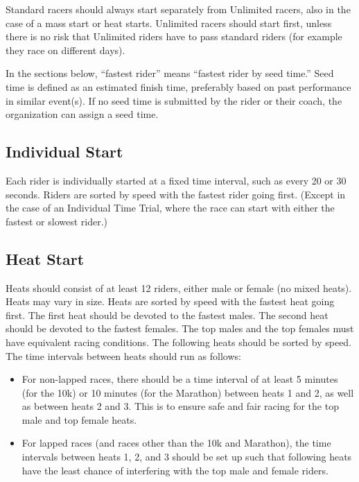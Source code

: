 Standard racers should always start separately from Unlimited racers, also in the case of a mass start or heat starts.
Unlimited racers should start first, unless there is no risk that Unlimited riders have to pass standard riders (for example they race on different days).

In the sections below, ``fastest rider'' means ``fastest rider by seed time.'' Seed time is defined as an estimated finish time, preferably based on past performance in similar event(s).
If no seed time is submitted by the rider or their coach, the organization can assign a seed time.

\subsection{Individual Start \label{subsec:road_heat-assignment_individual-start}}

Each rider is individually started at a fixed time interval, such as every 20 or 30 seconds.
Riders are sorted by speed with the fastest rider going first.
(Except in the case of an Individual Time Trial, where the race can start with either the fastest or slowest rider.)

\subsection{Heat Start \label{subsec:road_heat-assignment_heat-start}}

Heats should consist of at least 12 riders, either male or female (no mixed heats).
Heats may vary in size.
Heats are sorted by speed with the fastest heat going first.
The first heat should be devoted to the fastest males.
The second heat should be devoted to the fastest females.
The top males and the top females must have equivalent racing conditions.
The following heats should be sorted by speed.
The time intervals between heats should run as follows:
\begin{itemize}
\item For non-lapped races, there should be a time interval of at least 5 minutes (for the 10k) or 10 minutes (for the Marathon) between heats 1 and 2, as well as between heats 2 and 3.
  This is to ensure safe and fair racing for the top male and top female heats.
\item For lapped races (and races other than the 10k and Marathon), the time intervals between heats 1, 2, and 3 should be set up such that following heats have the least chance of interfering with the top male and female riders.
\end{itemize}

